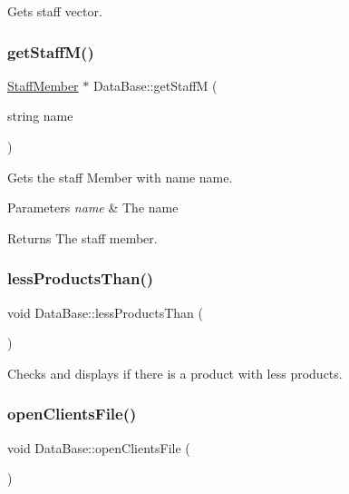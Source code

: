 Gets staff vector. 

\mbox{\label{classDataBase_af3c7f6a88b927dbd01b34121eefabe4d}} 
\subsubsection{\texorpdfstring{get\+Staff\+M()}{getStaffM()}}
{\footnotesize\ttfamily \hyperlink{classStaffMember}{Staff\+Member} $\ast$ Data\+Base\+::get\+StaffM (\begin{DoxyParamCaption}\item[{string}]{name }\end{DoxyParamCaption})}



Gets the staff Member with name name. 


\begin{DoxyParams}{Parameters}
{\em name} & The name\\
\hline
\end{DoxyParams}
\begin{DoxyReturn}{Returns}
The staff member. 
\end{DoxyReturn}
\mbox{\label{classDataBase_a6255a0d9489dee6c6de802bcfff2d19e}} 
\subsubsection{\texorpdfstring{less\+Products\+Than()}{lessProductsThan()}}
{\footnotesize\ttfamily void Data\+Base\+::less\+Products\+Than (\begin{DoxyParamCaption}{ }\end{DoxyParamCaption})}



Checks and displays if there is a product with less products. 

\mbox{\label{classDataBase_a514959070d22346ea7ee212e51cab89f}} 
\subsubsection{\texorpdfstring{open\+Clients\+File()}{openClientsFile()}}
{\footnotesize\ttfamily void Data\+Base\+::open\+Clients\+File (\begin{DoxyParamCaption}{ }\end{DoxyParamCaption})}

